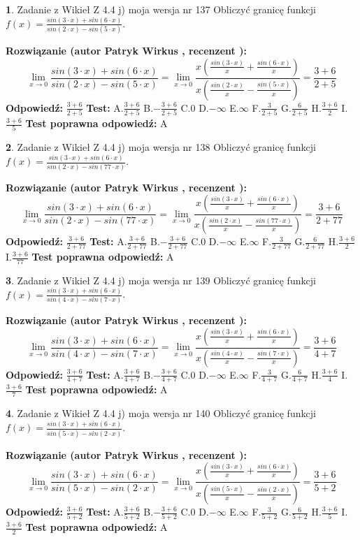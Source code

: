 \documentclass[12pt, a4paper]{article}
\theoremstyle{definition} %
\newtheorem{zad}{}
\newcommand{\zadStart}[1]{\begin{zad}#1\newline}
\newcommand{\zadStop}{\end{zad}}
\newcommand{\rozwStart}[2]{\noindent \textbf{Rozwiązanie (autor #1 , recenzent #2): }\newline}
\newcommand{\rozwStop}{\newline}
\newcommand{\odpStart}{\noindent \textbf{Odpowiedź:}\newline}
\newcommand{\odpStop}{\newline}
\newcommand{\testStart}{\noindent \textbf{Test:}\newline}
\newcommand{\testStop}{\newline}
\newcommand{\kluczStart}{\noindent \textbf{Test poprawna odpowiedź:}\newline}
\newcommand{\kluczStop}{\newline}
\begin{document}
\zadStart{Zadanie z Wikieł Z 4.4 j) moja wersja nr 137}
Obliczyć granicę funkcji $f(x)=\frac{sin(3\cdot x) +sin(6\cdot x)}{sin(2\cdot x) -sin(5\cdot x)}$.
\zadStop
\rozwStart{Patryk Wirkus}{}
$$\lim\limits_{x\to 0}\frac{sin(3\cdot x) +sin(6\cdot x)}{sin(2\cdot x) -sin(5\cdot x)}=\lim\limits_{x\to 0}\frac{x(\frac{sin(3\cdot x)}{x}+\frac{sin(6\cdot x)}{x})}{x(\frac{sin(2\cdot x)}{x}-\frac{sin(5\cdot x)}{x})}=\frac{3+6}{2+5}$$
\rozwStop
\odpStart
$\frac{3+6}{2+5}$
\odpStop
\testStart
A.$\frac{3+6}{2+5}$
B.$-\frac{3+6}{2+5}$
C.$0$
D.$-\infty$
E.$\infty$
F.$\frac{3}{2+5}$
G.$\frac{6}{2+5}$
H.$\frac{3+6}{2}$
I.$\frac{3+6}{5}$
\testStop
\kluczStart
A
\kluczStop



\zadStart{Zadanie z Wikieł Z 4.4 j) moja wersja nr 138}
Obliczyć granicę funkcji $f(x)=\frac{sin(3\cdot x) +sin(6\cdot x)}{sin(2\cdot x) -sin(77\cdot x)}$.
\zadStop
\rozwStart{Patryk Wirkus}{}
$$\lim\limits_{x\to 0}\frac{sin(3\cdot x) +sin(6\cdot x)}{sin(2\cdot x) -sin(77\cdot x)}=\lim\limits_{x\to 0}\frac{x(\frac{sin(3\cdot x)}{x}+\frac{sin(6\cdot x)}{x})}{x(\frac{sin(2\cdot x)}{x}-\frac{sin(77\cdot x)}{x})}=\frac{3+6}{2+77}$$
\rozwStop
\odpStart
$\frac{3+6}{2+77}$
\odpStop
\testStart
A.$\frac{3+6}{2+77}$
B.$-\frac{3+6}{2+77}$
C.$0$
D.$-\infty$
E.$\infty$
F.$\frac{3}{2+77}$
G.$\frac{6}{2+77}$
H.$\frac{3+6}{2}$
I.$\frac{3+6}{77}$
\testStop
\kluczStart
A
\kluczStop



\zadStart{Zadanie z Wikieł Z 4.4 j) moja wersja nr 139}
Obliczyć granicę funkcji $f(x)=\frac{sin(3\cdot x) +sin(6\cdot x)}{sin(4\cdot x) -sin(7\cdot x)}$.
\zadStop
\rozwStart{Patryk Wirkus}{}
$$\lim\limits_{x\to 0}\frac{sin(3\cdot x) +sin(6\cdot x)}{sin(4\cdot x) -sin(7\cdot x)}=\lim\limits_{x\to 0}\frac{x(\frac{sin(3\cdot x)}{x}+\frac{sin(6\cdot x)}{x})}{x(\frac{sin(4\cdot x)}{x}-\frac{sin(7\cdot x)}{x})}=\frac{3+6}{4+7}$$
\rozwStop
\odpStart
$\frac{3+6}{4+7}$
\odpStop
\testStart
A.$\frac{3+6}{4+7}$
B.$-\frac{3+6}{4+7}$
C.$0$
D.$-\infty$
E.$\infty$
F.$\frac{3}{4+7}$
G.$\frac{6}{4+7}$
H.$\frac{3+6}{4}$
I.$\frac{3+6}{7}$
\testStop
\kluczStart
A
\kluczStop



\zadStart{Zadanie z Wikieł Z 4.4 j) moja wersja nr 140}
Obliczyć granicę funkcji $f(x)=\frac{sin(3\cdot x) +sin(6\cdot x)}{sin(5\cdot x) -sin(2\cdot x)}$.
\zadStop
\rozwStart{Patryk Wirkus}{}
$$\lim\limits_{x\to 0}\frac{sin(3\cdot x) +sin(6\cdot x)}{sin(5\cdot x) -sin(2\cdot x)}=\lim\limits_{x\to 0}\frac{x(\frac{sin(3\cdot x)}{x}+\frac{sin(6\cdot x)}{x})}{x(\frac{sin(5\cdot x)}{x}-\frac{sin(2\cdot x)}{x})}=\frac{3+6}{5+2}$$
\rozwStop
\odpStart
$\frac{3+6}{5+2}$
\odpStop
\testStart
A.$\frac{3+6}{5+2}$
B.$-\frac{3+6}{5+2}$
C.$0$
D.$-\infty$
E.$\infty$
F.$\frac{3}{5+2}$
G.$\frac{6}{5+2}$
H.$\frac{3+6}{5}$
I.$\frac{3+6}{2}$
\testStop
\kluczStart
A
\kluczStop
\end{document}
